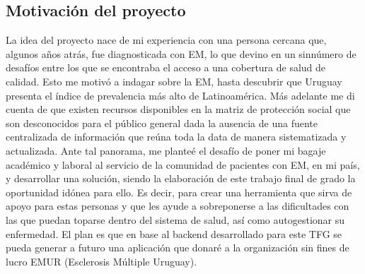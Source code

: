 
\subsection{Motivación del proyecto}
La idea del proyecto nace de mi experiencia con una persona cercana que, algunos años atrás, fue diagnosticada con EM, lo que devino en un sinnúmero de desafíos entre los que se encontraba el acceso a una cobertura de salud de calidad. Esto me motivó a indagar sobre la EM, hasta descubrir que Uruguay presenta el índice de prevalencia más alto de Latinoamérica. Más adelante me di cuenta de que existen recursos disponibles en la matriz de protección social que son desconocidos para el público general dada la ausencia de una fuente centralizada de información que reúna toda la data de manera sistematizada y actualizada. 
Ante tal panorama, me planteé el desafío de poner mi bagaje académico y laboral al servicio de la comunidad de pacientes con EM, en mi país, y desarrollar una solución, siendo la elaboración de este trabajo final de grado la oportunidad idónea para ello. Es decir, para crear una herramienta que sirva de apoyo para estas personas y que les ayude a sobreponerse a las dificultades con las que puedan toparse dentro del sistema de salud, así como autogestionar su enfermedad. El plan es que en base al backend desarrollado para este TFG se pueda generar a futuro una aplicación que donaré a la organización sin fines de lucro EMUR (Esclerosis Múltiple Uruguay).

